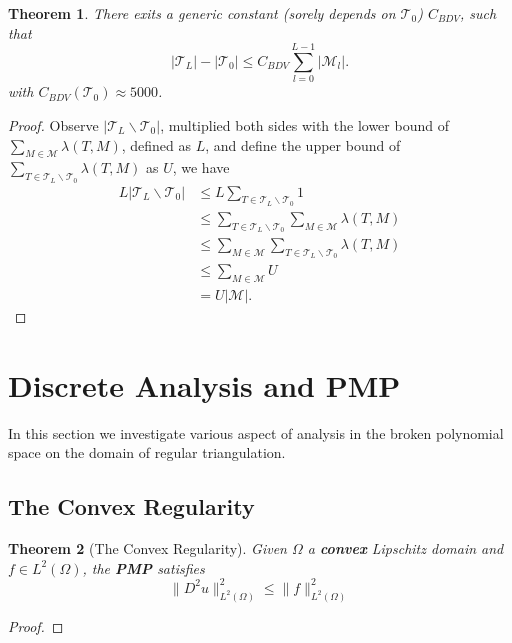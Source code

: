 \documentclass[a4paper,12pt,oneside,fleqn]{book}
\newtheorem{theorem}{Theorem}[section]
\theoremstyle{definition}
\theoremstyle{remark}
\begin{document}
\begin{theorem}
	There exits a generic constant (sorely depends on $\mathcal{T}_0$) $C_{BDV}$, such that 
	\begin{equation}
		|\mathcal{T}_L| - |\mathcal{T}_0| \le C_{BDV} \sum_{l = 0}^{L -1} |\mathcal{M}_l|.
	\end{equation}
	with $C_{BDV}(\mathcal{T}_0) \approx 5000$.
\end{theorem}
\begin{proof}
	Observe $|\mathcal{T}_L \backslash \mathcal{T}_0|$, multiplied both sides with the lower bound of $\sum_{M \in \mathcal{M}} \lambda(T, M)$, defined as $L$, and define the upper bound of $\sum_{T \in \mathcal{T}_L \backslash \mathcal{T}_0} \lambda (T, M) $ as $U$, we have
	\begin{align*}
		L |\mathcal{T}_L \backslash \mathcal{T}_0| &\le L \sum_{T \in \mathcal{T}_L \backslash \mathcal{T}_0} 1 \\
		& \le \sum_{T \in \mathcal{T}_L \backslash \mathcal{T}_0} \sum_{M \in \mathcal{M}} \lambda(T, M)\\
		& \le  \sum_{M \in \mathcal{M}} \sum_{T \in \mathcal{T}_L \backslash \mathcal{T}_0} \lambda(T, M)\\
		& \le \sum_{M \in \mathcal{M}} U\\
		& = U|\mathcal{M}|. 
	\end{align*}
\end{proof}



\section{Discrete Analysis and PMP}
In this section we investigate various aspect of analysis in the broken polynomial space on the domain of regular triangulation.
\subsection{The Convex Regularity}
\begin{theorem}[The Convex Regularity]
	Given $\Omega$ a \textbf{convex} Lipschitz domain and $f \in L^2(\Omega)$, the \textbf{PMP} satisfies
	\begin{equation}
		\|D^2 u \|_{L^2(\Omega)}^2 \le \|f\|_{L^2(\Omega)}^2
	\end{equation}
\end{theorem}
\begin{proof}
\end{proof}
\end{document}
